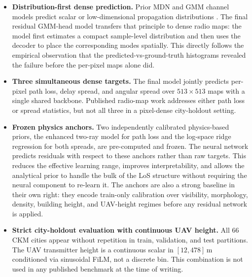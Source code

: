 \begin{itemize}
  \item \textbf{Distribution-first dense prediction.}  Prior MDN and GMM
        channel models predict scalar or low-dimensional propagation
        distributions \cite{saleh2021probabilistic,garciamarti2020mixture,lee2024timevarying}.
        The final residual GMM-head model transfers that principle to dense radio maps: the model first
        estimates a compact sample-level distribution and then uses the
        decoder to place the corresponding modes spatially.  This directly
        follows the empirical observation that the predicted-vs-ground-truth
        histograms revealed the failure before the per-pixel maps alone did.

  \item \textbf{Three simultaneous dense targets.} The final model jointly predicts
        per-pixel path loss, delay spread, and angular spread over
        $513 \times 513$ maps with a single shared backbone.  Published radio-map
        work addresses either path loss or spread statistics, but not all three
        in a pixel-dense city-holdout setting.

  \item \textbf{Frozen physics anchors.}  Two independently calibrated
        physics-based priors, the enhanced two-ray model for path
        loss and the log-space ridge regression for both spreads, are
        pre-computed and frozen.  The neural network predicts residuals with
        respect to these anchors rather than raw targets.  This reduces the
        effective learning range, improves interpretability, and allows the
        analytical prior to handle the bulk of the LoS structure without
        requiring the neural component to re-learn it.  The anchors are also a
        strong baseline in their own right: they encode train-only calibration
        over visibility, morphology, density, building height, and UAV-height
        regimes before any residual network is applied.

  \item \textbf{Strict city-holdout evaluation with continuous UAV height.}
        All 66 CKM cities appear without repetition in train, validation, and
        test partitions.  The UAV transmitter height is a continuous scalar in
        $[12, 478]\,\mathrm{m}$ conditioned via sinusoidal FiLM, not a discrete
        bin.  This combination is not used in any published benchmark at the
        time of writing.
\end{itemize}

